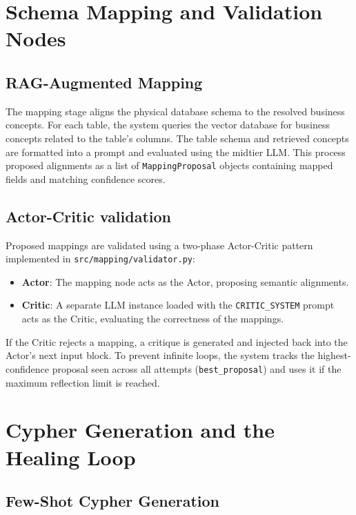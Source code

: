\section{Schema Mapping and Validation Nodes}
\label{sec:imp:mapping_validation}

\subsection{RAG-Augmented Mapping}
\label{sec:imp:rag_mapper}

The mapping stage aligns the physical database schema to the resolved business concepts. For each table, the system queries the vector database for business concepts related to the table's columns. The table schema and retrieved concepts are formatted into a prompt and evaluated using the midtier LLM. This process proposed alignments as a list of \texttt{MappingProposal} objects containing mapped fields and matching confidence scores.

\subsection{Actor-Critic validation}
\label{sec:imp:validator}

Proposed mappings are validated using a two-phase Actor-Critic pattern implemented in \texttt{src/mapping/validator.py}:
\begin{itemize}
    \item \textbf{Actor}: The mapping node acts as the Actor, proposing semantic alignments.
    \item \textbf{Critic}: A separate LLM instance loaded with the \texttt{CRITIC\_SYSTEM} prompt acts as the Critic, evaluating the correctness of the mappings.
\end{itemize}
If the Critic rejects a mapping, a critique is generated and injected back into the Actor's next input block. To prevent infinite loops, the system tracks the highest-confidence proposal seen across all attempts (\texttt{best\_proposal}) and uses it if the maximum reflection limit is reached.

\section{Cypher Generation and the Healing Loop}
\label{sec:imp:cypher_healing}

\subsection{Few-Shot Cypher Generation}
\label{sec:imp:cypher_generator}

